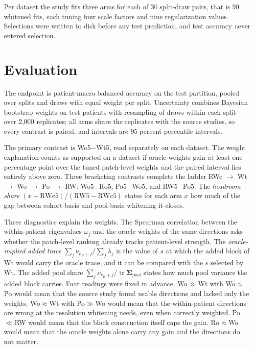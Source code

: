 \documentclass[11pt]{article}
\begin{document}
\noindent Per dataset the study fits three arms for each of 30 split-draw pairs, that is 90 whitened fits, each tuning four scale factors and nine regularization values. Selections were written to disk before any test prediction, and test accuracy never entered selection.

\section{Evaluation}
\label{sec:evaluation}
The endpoint is patient-macro balanced accuracy on the test partition, pooled over splits and draws with equal weight per split. Uncertainty combines Bayesian bootstrap weights on test patients \citep{rubin1981bayesian} with resampling of draws within each split over 2,000 replicates; all arms share the replicates with the source studies, so every contrast is paired, and intervals are 95 percent percentile intervals.

The primary contrast is Wo5$-$Wt5, read separately on each dataset. The weight explanation counts as supported on a dataset if oracle weights gain at least one percentage point over the tuned patch-level weights and the paired interval lies entirely above zero. Three bracketing contrasts complete the ladder RWc $\to$ Wt $\to$ Wo $\to$ Po $\to$ RW: Wo5$-$Ro5, Po5$-$Wo5, and RW5$-$Po5. The \emph{headroom share} $(x-\mathrm{RWc5})/(\mathrm{RW5}-\mathrm{RWc5})$ states for each arm $x$ how much of the gap between cohort-basis and pool-basis whitening it closes.

Three diagnostics explain the weights. The Spearman correlation between the within-patient eigenvalues $\omega_j$ and the oracle weights of the same directions asks whether the patch-level ranking already tracks patient-level strength. The \emph{oracle-implied added trace} $\sum_j\nu_{r_B+j}/\sum_j\lambda_j$ is the value of $s$ at which the added block of Wt would carry the oracle trace, and it can be compared with the $s$ selected by Wt. The added pool share $\sum_j\nu_{r_B+j}/\operatorname{tr}\boldsymbol\Sigma_{\text{pool}}$ states how much pool variance the added block carries. Four readings were fixed in advance. Wo$\gg$Wt with Wo$\approx$Po would mean that the source study found usable directions and lacked only the weights. Wo$\approx$Wt with Po$\gg$Wo would mean that the within-patient directions are wrong at the resolution whitening needs, even when correctly weighted. Po$\ll$RW would mean that the block construction itself caps the gain. Ro$\approx$Wo would mean that the oracle weights alone carry any gain and the directions do not matter.





\end{document}

